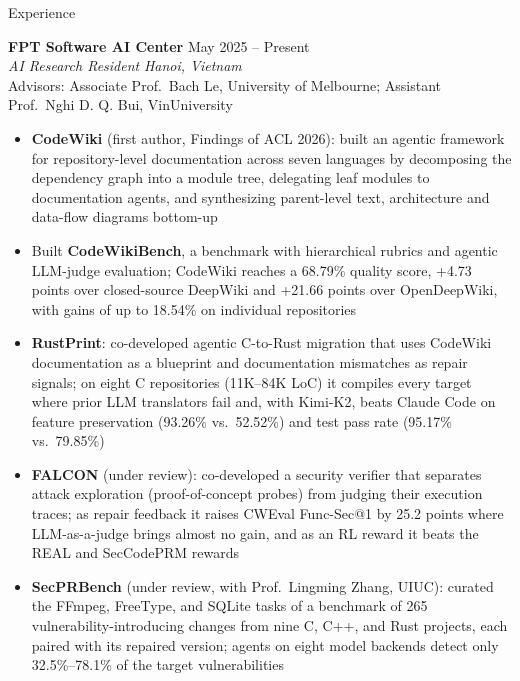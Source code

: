 \documentclass{resume} %
\begin{document}
\begin{rSection}{Experience}

\textbf{FPT Software AI Center} \hfill May 2025 -- Present\\
\textit{AI Research Resident} \hfill \textit{Hanoi, Vietnam}\\
Advisors: Associate Prof.\ Bach Le, University of Melbourne;
Assistant Prof.\ Nghi D. Q. Bui, VinUniversity

\begin{itemize}[leftmargin=1.5em,itemsep=0em,topsep=0.1em]
    \item \textbf{CodeWiki} (first author, Findings of ACL 2026): built an agentic
    framework for repository-level documentation across seven languages by
    decomposing the dependency graph into a module tree, delegating leaf modules
    to documentation agents, and synthesizing parent-level text, architecture and
    data-flow diagrams bottom-up
    \item Built \textbf{CodeWikiBench}, a benchmark with hierarchical rubrics and
    agentic LLM-judge evaluation; CodeWiki reaches a 68.79\% quality score,
    +4.73 points over closed-source DeepWiki and +21.66 points over OpenDeepWiki,
    with gains of up to 18.54\% on individual repositories
    \item \textbf{RustPrint}: co-developed agentic C-to-Rust migration that uses
    CodeWiki documentation as a blueprint and documentation mismatches as repair
    signals; on eight C repositories (11K--84K LoC) it compiles every target where
    prior LLM translators fail and, with Kimi-K2, beats Claude Code on feature
    preservation (93.26\% vs.\ 52.52\%) and test pass rate (95.17\% vs.\ 79.85\%)
    \item \textbf{FALCON} (under review): co-developed a security verifier that
    separates attack exploration (proof-of-concept probes) from judging their
    execution traces; as repair feedback it raises CWEval Func-Sec@1 by 25.2
    points where LLM-as-a-judge brings almost no gain, and as an RL reward it
    beats the REAL and SecCodePRM rewards
    \item \textbf{SecPRBench} (under review, with Prof.\ Lingming Zhang, UIUC):
    curated the FFmpeg, FreeType, and SQLite tasks of a benchmark of 265
    vulnerability-introducing changes from nine C, C++, and Rust projects, each
    paired with its repaired version; agents on eight model backends detect only
    32.5\%--78.1\% of the target vulnerabilities
\end{itemize}


\end{rSection}
\end{document}
